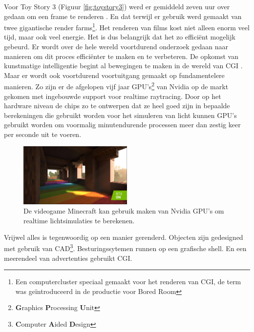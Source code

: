 \documentclass[12pt, a4paper]{article}
\begin{document}
Voor Toy Story 3 (Figuur \ref{fig:toystory3}) werd er gemiddeld zeven uur over gedaan om een frame te renderen \cite{HowToyStory3WasMade}. En dat terwijl er gebruik werd gemaakt van twee gigantische render farms\footnote{Een computercluster speciaal gemaakt voor het renderen van CGI, de term was geïntroduceerd in de productie voor Bored Room\cite{MakingOfBoredRoom}}. Het renderen van films kost niet alleen enorm veel tijd, maar ook veel energie. Het is dus belangrijk dat het zo efficiënt mogelijk gebeurd. Er wordt over de hele wereld voortdurend onderzoek gedaan naar manieren om dit proces efficiënter te maken en te verbeteren. De opkomst van kunstmatige intelligentie begint al bewegingen te maken in de wereld van CGI \cite{NeRFactor}. Maar er wordt ook voortdurend voortuitgang gemaakt op fundamentelere manieren. Zo zijn er de afgelopen vijf jaar GPU's\footnote{\textbf{G}raphics \textbf{P}rocessing \textbf{U}nit} van Nvidia op de markt gekomen met ingebouwde support voor realtime raytracing\cite{NvidiaRTX}. Door op het hardware niveau de chips zo te ontwerpen dat ze heel goed zijn in bepaalde berekeningen die gebruikt worden voor het simuleren van licht kunnen GPU's gebruikt worden om voormalig minutendurende processen meer dan zestig keer per seconde uit te voeren. 
\begin{figure}[H]
    \centering
    \includegraphics[width=0.5\textwidth]{minecraftrtx.jpg}
    \caption{De videogame Minecraft kan gebruik maken van Nvidia GPU's om realtime lichtsimulaties te berekenen.}
    \label{fig:minecraftrtx}
\end{figure}

Vrijwel alles is tegenwoordig op een manier gerenderd. Objecten zijn gedesigned met gebruik van CAD\footnote{\textbf{C}omputer \textbf{A}ided \textbf{D}esign}. Besturingssytemen runnen op een grafische shell. En een meerendeel van advertenties gebruikt CGI.
\end{document}

